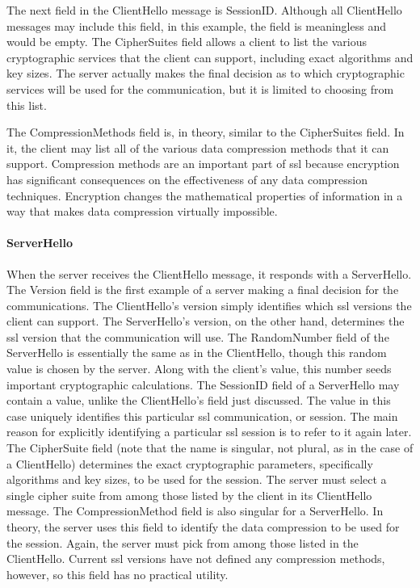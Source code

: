 The next field in the ClientHello message is SessionID. Although all
ClientHello messages may include this field, in this example, the
field is meaningless and would be empty. 
The CipherSuites field allows a client to list the various cryptographic
services that the client can support, including exact algorithms and
key sizes. The server actually makes the final decision as to which
cryptographic services will be used for the communication, but it is
limited to choosing from this list. 

The CompressionMethods field is, in theory, similar to the CipherSuites field.
 In it, the client may list all of the various data compression methods that 
 it can support. Compression methods are an
important part of ssl because encryption has significant consequences on the 
effectiveness of any data compression techniques. Encryption changes the 
mathematical properties of information in a
way that makes data compression virtually impossible. 

\paragraph*{ServerHello}
When the server receives the ClientHello message, it responds with a
ServerHello. 
The Version field is the first example of a server making a final 
decision for the communications. The ClientHello’s version simply identifies 
which ssl versions the client can support. The ServerHello’s
version, on the other hand, determines the ssl version that the communication
 will use. 
The RandomNumber field of the ServerHello is essentially the same
as in the ClientHello, though this random value is chosen by the
server. Along with the client’s value, this number seeds important
cryptographic calculations. 
The SessionID field of a ServerHello may contain a value, unlike the
ClientHello’s field just discussed. The value in this case uniquely
identifies this particular ssl communication, or session. The main reason for 
explicitly identifying a particular ssl session is to refer to it
again later.
The CipherSuite field (note that the name is singular, not plural, as in
the case of a ClientHello) determines the exact cryptographic parameters, 
specifically algorithms and key sizes, to be used for the session. 
The server must select a single cipher suite from among those
listed by the client in its ClientHello message.
The CompressionMethod field is also singular for a ServerHello. In
theory, the server uses this field to identify the data compression to
be used for the session. Again, the server must pick from among
those listed in the ClientHello. Current ssl versions have not defined
any compression methods, however, so this field has no practical utility.

